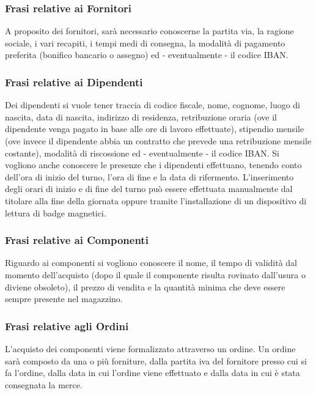 		\subsubsection{Frasi relative ai Fornitori}
			
			A proposito dei fornitori, sarà necessario conoscerne la partita via, la ragione sociale, i vari recapiti, i tempi medi di consegna, la modalità di pagamento preferita (bonifico bancario o assegno) ed - eventualmente - il codice IBAN.
		
		\subsubsection{Frasi relative ai Dipendenti} 
			
			Dei dipendenti si vuole tener traccia di codice fiscale, nome, cognome, luogo di nascita, data di nascita, indirizzo di residenza, retribuzione oraria (ove il dipendente venga pagato in base alle ore di lavoro effettuate), stipendio mensile (ove invece il dipendente abbia un contratto che prevede una retribuzione mensile costante), modalità di riscossione ed - eventualmente - il codice IBAN. Si vogliono anche conoscere le presenze che i dipendenti effettuano, tenendo conto dell’ora di inizio del turno, l’ora di fine e la data di rifermento. 
			L'inserimento degli orari di inizio e di fine del turno può essere effettuata manualmente dal titolare alla fine della giornata oppure tramite l'installazione di un dispositivo di lettura di badge magnetici.
			
		\subsubsection{Frasi relative ai Componenti}
			
			Riguardo ai componenti si vogliono conoscere il nome, il tempo di validità dal momento dell'acquisto (dopo il quale il componente risulta rovinato dall'usura o diviene obsoleto), il prezzo di vendita e la quantità minima che deve essere sempre presente nel magazzino.
			
		\subsubsection{Frasi relative agli Ordini}
		
			L'acquisto dei componenti viene formalizzato attraverso un ordine. Un ordine sarà composto da una o più forniture, dalla partita iva del fornitore presso cui si fa l'ordine, dalla data in cui l'ordine viene effettuato e dalla data in cui è stata consegnata la merce.
		
